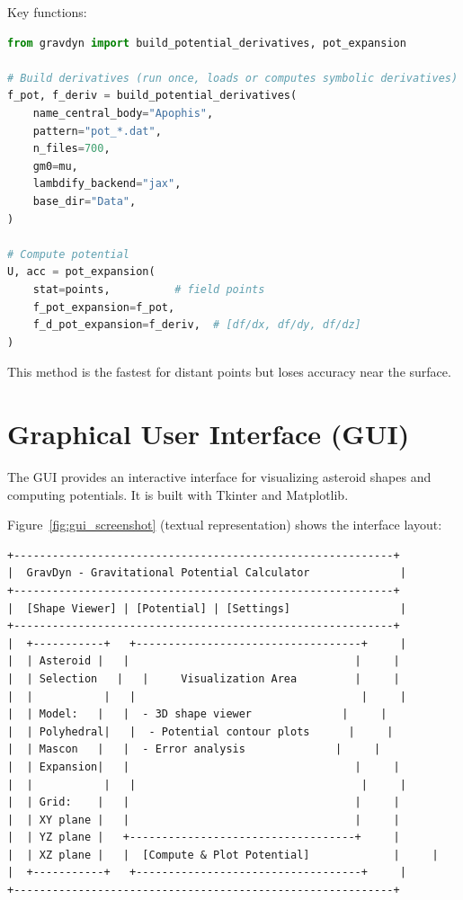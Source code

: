 \documentclass[a4paper,12pt]{article}
\begin{document}
Key functions:

\begin{lstlisting}[language=Python]
from gravdyn import build_potential_derivatives, pot_expansion

# Build derivatives (run once, loads or computes symbolic derivatives)
f_pot, f_deriv = build_potential_derivatives(
    name_central_body="Apophis",
    pattern="pot_*.dat",
    n_files=700,
    gm0=mu,
    lambdify_backend="jax",
    base_dir="Data",
)

# Compute potential
U, acc = pot_expansion(
    stat=points,          # field points
    f_pot_expansion=f_pot,
    f_d_pot_expansion=f_deriv,  # [df/dx, df/dy, df/dz]
)
\end{lstlisting}

This method is the fastest for distant points but loses accuracy near the surface.

\section{Graphical User Interface (GUI)}

The GUI provides an interactive interface for visualizing asteroid shapes and computing potentials. It is built with Tkinter and Matplotlib.

Figure~\ref{fig:gui_screenshot} (textual representation) shows the interface layout:

\begin{verbatim}
+-----------------------------------------------------------+
|  GravDyn - Gravitational Potential Calculator              |
+-----------------------------------------------------------+
|  [Shape Viewer] | [Potential] | [Settings]                 |
+-----------------------------------------------------------+
|  +-----------+   +-----------------------------------+     |
|  | Asteroid |   |                                   |     |
|  | Selection   |   |     Visualization Area         |     |
|  |           |   |                                   |     |
|  | Model:   |   |  - 3D shape viewer              |     |
|  | Polyhedral|   |  - Potential contour plots      |     |
|  | Mascon   |   |  - Error analysis              |     |
|  | Expansion|   |                                   |     |
|  |           |   |                                   |     |
|  | Grid:    |   |                                   |     |
|  | XY plane |   |                                   |     |
|  | YZ plane |   +-----------------------------------+     |
|  | XZ plane |   |  [Compute & Plot Potential]             |     |
|  +-----------+   +-----------------------------------+     |
+-----------------------------------------------------------+
\end{verbatim}
\end{document}
